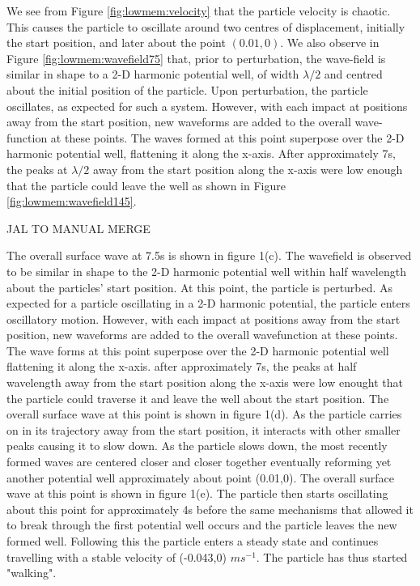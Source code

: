 We see from Figure \ref{fig:lowmem:velocity} that the particle velocity is chaotic. This causes the particle to oscillate around two centres of displacement, initially the start position, and later about the point $(0.01,0)$. We also observe in Figure \ref{fig:lowmem:wavefield75} that, prior to perturbation, the wave-field is similar in shape to a 2-D harmonic potential well, of width $\lambda/2$ and centred about the initial position of the particle. Upon perturbation, the particle oscillates, as expected for such a system. However, with each impact at positions away from the start position, new waveforms are added to the overall wave-function at these points. The waves formed at this point superpose over the 2-D harmonic potential well, flattening it along the x-axis. After approximately 7s, the peaks at $\lambda/2$ away from the start position along the x-axis were low enough that the particle could leave the well as shown in Figure \ref{fig:lowmem:wavefield145}.

JAL TO MANUAL MERGE

The overall surface wave at 7.5s is shown in figure 1(c). The wavefield is observed to be similar in shape to the 2-D harmonic potential well within half wavelength about the particles' start position. At this point, the particle is perturbed. As expected for a particle oscillating in a 2-D harmonic potential, the particle enters oscillatory motion. However, with each impact at positions away from the start position, new waveforms are added to the overall wavefunction at these points. The wave forms at this point superpose over the 2-D harmonic potential well flattening it along the x-axis. after approximately 7s, the peaks at half wavelength away from the start position along the x-axis were low enought that the particle could traverse it and leave the well about the start position. The overall surface wave at this point is shown in figure 1(d). As the particle carries on in its trajectory away from the start position, it interacts with other smaller peaks causing it to slow down. As the particle slows down, the most recently formed waves are centered closer and closer together eventually reforming yet another potential well approximately about point (0.01,0). The overall surface wave at this point is shown in figure 1(e). The particle then starts oscillating about this point for approximately 4s before the same mechanisms that allowed it to break through the first potential well occurs and the particle leaves the new formed well. Following this the particle enters a steady state and continues travelling with a stable velocity of (-0.043,0) $ms^{-1}$. The particle has thus started "walking". 


